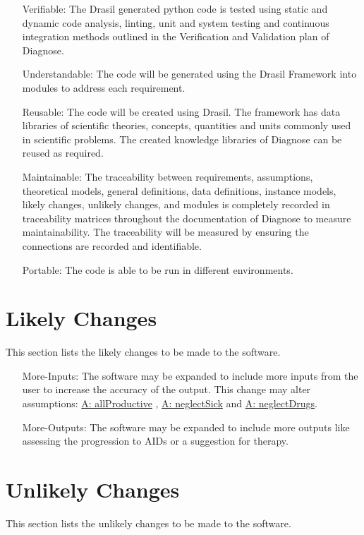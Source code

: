 \documentclass[12pt]{article}
\begin{document}
\begin{itemize}
\item[Verifiable:\phantomsection\label{verifiable}]{The Drasil generated python code is tested using static and dynamic code analysis, linting, unit and system testing and continuous integration methods outlined in the Verification  and Validation plan of Diagnose.}
\item[Understandable:\phantomsection\label{understandable}]{The code will be generated using the Drasil Framework into modules to address each requirement.}
\item[Reusable:\phantomsection\label{reusable}]{The code will be created using Drasil. The framework has data libraries of scientific theories, concepts, quantities and units commonly used in scientific problems. The created knowledge libraries of Diagnose can be reused as required.}
\item[Maintainable:\phantomsection\label{maintainable}]{The traceability between requirements, assumptions, theoretical models, general definitions, data definitions, instance models, likely changes, unlikely changes, and modules is completely recorded in traceability matrices throughout the documentation of Diagnose to measure maintainability. The traceability will be measured by ensuring the connections are recorded and identifiable.}
\item[Portable:\phantomsection\label{portable}]{The code is able to be run in different environments.}
\end{itemize}
\section{Likely Changes}
\label{Sec:LCs}
This section lists the likely changes to be made to the software.

\begin{itemize}
\item[More-Inputs:\phantomsection\label{moreInputs}]{The software may be expanded to include more inputs from the user  to increase the accuracy of the output. This change may alter assumptions: \hyperref[allProductive]{A: allProductive} , \hyperref[neglectSick]{A: neglectSick} and \hyperref[neglectDrugs]{A: neglectDrugs}.}
\item[More-Outputs:\phantomsection\label{moreOutputs}]{The software may be expanded to include more outputs  like assessing the progression to AIDs or a suggestion for therapy.}
\end{itemize}
\section{Unlikely Changes}
\label{Sec:UCs}
This section lists the unlikely changes to be made to the software.
\end{document}
